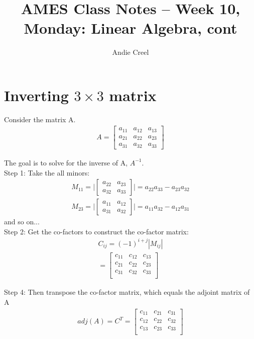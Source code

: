 \documentclass{article}
\title{AMES Class Notes -- Week 10, Monday: Linear Algebra, cont}
\author{Andie Creel}
\begin{document}
\maketitle

\section{Inverting $3 \times 3$ matrix}
Consider the matrix A. 
\begin{align}
    A = \begin{bmatrix}
                a_{11} & a_{12} & a_{13} \\
                a_{21} & a_{22} & a_{23} \\
                a_{31} & a_{32} & a_{33}
    \end{bmatrix}
\end{align}

The goal is to solve for the inverse of A, $A^{-1}$.\\


Step 1: Take the all minors: 
\begin{align}
    M_{11} = \Bigg| \begin{bmatrix}
                    a_{22} & a_{23} \\
                    a_{32} & a_{33}
    \end{bmatrix} \Bigg| = a_{22}a_{33} - a_{23} a_{32} \\
    M_{23} = \Bigg| \begin{bmatrix}
                    a_{11} & a_{12} \\
                    a_{31} & a_{32}
    \end{bmatrix} \Bigg|   = a_{11} a_{32} - a_{12} a_{31}
\end{align}
and so on... \\

Step 2: Get the co-factors to construct the co-factor matrix: 
\begin{align}
    C_{ij} = (-1)^{i + j} | M_{ij} |  \\
    = \begin{bmatrix}
        c_{11} & c_{12} & c_{13}\\
        c_{21} & c_{22} & c_{23}\\
        c_{31} & c_{32} & c_{33}\\
    \end{bmatrix}
\end{align}

Step 4: Then transpose the co-factor matrix, which equals the adjoint matrix of A
\begin{align}
    adj(A) = C^T = \begin{bmatrix}
        c_{11} & c_{21} & c_{31}\\
        c_{12} & c_{22} & c_{32}\\
        c_{13} & c_{23} & c_{33}\\
    \end{bmatrix}
\end{align}
\end{document}
